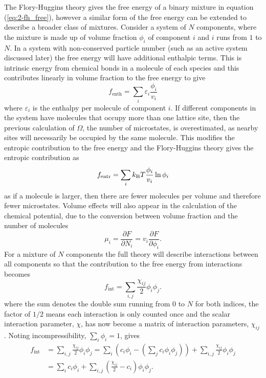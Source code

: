 The Flory-Huggins theory gives the free energy of a binary mixture in equation (\ref{eq:2-fh_free}), however a similar form of the free energy can be extended to describe a broader class of mixtures. Consider a system of $N$ components, where the mixture is made up of volume fraction $\phi_i$ of component $i$ and $i$ runs from $1$ to $N$. In a system with non-conserved particle number (such as an active system discussed later) the free energy will have additional enthalpic terms. This is intrinsic energy from chemical bonds in a molecule of each species and this contributes linearly in volume fraction to the free energy to give
\begin{equation}
    f_\text{enth} = \sum_{i}\varepsilon_i \frac{\phi_i}{v_i}
\end{equation}
where $\varepsilon_i$ is the enthalpy per molecule of component $i$. If different components in the system have molecules that occupy more than one lattice site, then the previous calculation of $\Omega$, the number of microstates, is overestimated, as nearby sites will necessarily be occupied by the same molecule. This modifies the entropic contribution to the free energy and the Flory-Huggins theory gives the entropic contribution as
\begin{equation}
    f_\text{entr} = \sum_{i}k_{\rm B} T \frac{\phi_i}{v_i}\ln\phi_i
\end{equation}
as if a molecule is larger, then there are fewer molecules per volume and therefore fewer microstates. Volume effects will also appear in the calculation of the chemical potential, due to the conversion between volume fraction and the number of molecules
\begin{equation}
    \mu_i = \frac{\partial F}{\partial N_i} = v_i\frac{\partial F}{\partial \phi_i}.
\end{equation}
For a mixture of $N$ components the full theory will describe interactions between all components so that the contribution to the free energy from interactions becomes
\begin{equation}
    f_\text{int} = \sum_{i, j}\frac{\chi_{ij}}{2}\phi_i\phi_j.
\end{equation}
where the sum denotes the double sum running from $0$ to $N$ for both indices, the factor of $1/2$ means each interaction is only counted once and the scalar interaction parameter, $\chi$, has now become a matrix of interaction parameters, $\chi_{ij}$ \cite{mao_phase_2019}. Noting incompressibility, $\sum_{i}\phi_i = 1$, gives
\begin{equation}
\begin{split}
    f_\text{int} &= \sum_{i, j}\frac{\chi_{ij}}{2}\phi_i\phi_j = \sum_{i}\left(c_i\phi_i-\left(\sum_j c_i\phi_i\phi_j\right)\right) + \sum_{i, j}\frac{\chi_{ij}}{2}\phi_i\phi_j \\
    &= \sum_{i}c_i\phi_i + \sum_{i,j}\left(\frac{\chi_{ij}}{2}-c_i\right)\phi_i\phi_j.
\end{split}
\end{equation}
